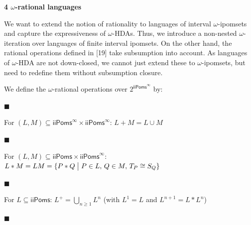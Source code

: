  
 
 


 
\par\medskip\noindent\textbf{4 $\omega$-rational languages}\par
 
 
We want to extend the notion of rationality to languages of interval $\omega$-ipomsets and capture the expressiveness of $\omega$-HDAs. Thus, we introduce a non-nested $\omega$-iteration over languages of finite interval ipomsets. On the other hand, the rational operations defined in [19] take subsumption into account. As languages of $\omega$-HDA are not down-closed, we cannot just extend these to $\omega$-ipomsets, but need to redefine them without subsumption closure.\par
 
 
 
We define the $\omega$-rational operations over $2^{\mathsf{iiPoms}^{\infty}}$ by:\par
  
\par\noindent  $\blacksquare$ 
 
For $(L,M)\subseteq{\mathsf{iiPoms}^{\infty}}\times{\mathsf{iiPoms}^{\infty}}$: $L+M=L\cup M$\par
 
 
 
\par\noindent  $\blacksquare$ 
 
For $(L,M)\subseteq\mathsf{iiPoms}\times{\mathsf{iiPoms}^{\infty}}$: $L*M=LM={\{P*Q\mathrel{\big{|}}P\in L,\,Q\in M,\,T_{P}\cong S_{Q}\}}$\par
 
 
 
\par\noindent  $\blacksquare$ 
 
For $L\subseteq\mathsf{iiPoms}$: $L^{+}=\bigcup_{n\geqslant 1}L^{n}$ (with $L^{1}=L$ and $L^{n+1}=L*L^{n}$)\par
 
 
 
\par\noindent  $\blacksquare$ 
 
